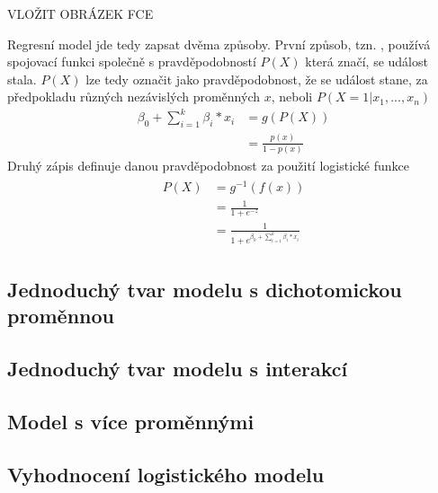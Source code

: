 VLOŽIT OBRÁZEK FCE

Regresní model jde tedy zapsat dvěma způsoby. První způsob, tzn. , používá spojovací funkci společně s pravděpodobností $P(X)$ která značí, se událost stala.
$P(X)$ lze tedy označit jako pravděpodobnost, že se událost stane, za předpokladu různých nezávislých proměnných $x$, neboli $P(X = 1 | x_1, ..., x_n)$
\begin{equation}
\begin{split}
    \beta_0 + \sum_{i=1}^k \beta_i*x_i &= g(P(X)) \\
                                      &= \frac{p(x)}{1 - p(x)}
\end{split}
\end{equation}
Druhý zápis definuje danou pravděpodobnost za použití logistické funkce
\begin{align}
\begin{split}
    P(X) &= g^{-1}(f(x)) \\
        &= \frac{1}{1+e^{-z}} \\
        &= \frac{1}{1+e^{\beta_0 + \sum_{i=1}^k \beta_i*x_i}}    
\end{split}
\end{align} 
\subsection{Jednoduchý tvar modelu s dichotomickou proměnnou}
\subsection{Jednoduchý tvar modelu s interakcí}
\subsection{Model s více proměnnými}
\subsection{Vyhodnocení logistického modelu}